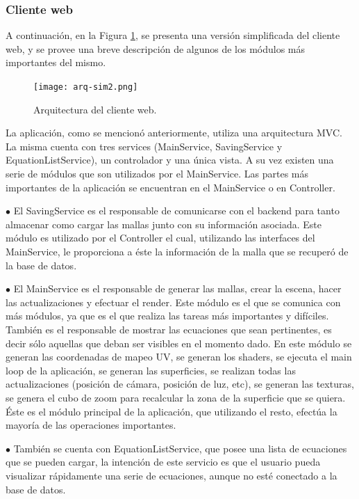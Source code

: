 \documentclass[12pt]{article}
\begin{document}
\subsubsection{Cliente web}
\noindent A continuación, en la Figura \ref{arq}, se presenta una versión simplificada del cliente web, y se provee una breve descripción de algunos de los módulos más importantes del mismo.\\
\begin{figure}[h!]
\texttt{[image: arq-sim2.png]}
\caption{Arquitectura del cliente web.}
\label{arq}
\end{figure}
La aplicación, como se mencionó anteriormente, utiliza una arquitectura MVC. La misma  cuenta con tres services (MainService, SavingService y EquationListService), un controlador y una única vista. A su vez existen una serie de módulos que son utilizados por el MainService. Las partes más importantes de la aplicación se encuentran en el MainService o en Controller.

$\bullet$ El SavingService es el responsable de comunicarse con el backend para tanto almacenar como cargar las mallas junto con su información asociada. Este módulo es utilizado por el Controller el cual, utilizando las interfaces del MainService, le proporciona a éste la información de la malla que se recuperó de la base de datos.

$\bullet$ El MainService es el responsable de generar las mallas, crear la escena, hacer las actualizaciones y efectuar el render. Este módulo es el que se comunica con más módulos, ya que es el que realiza las tareas más importantes y difíciles. También es el responsable de mostrar las ecuaciones que sean pertinentes, es decir sólo aquellas que deban ser visibles en el momento dado. En este módulo se generan las coordenadas de mapeo UV, se generan los shaders, se ejecuta el main loop de la aplicación, se generan las superficies, se realizan todas las actualizaciones (posición de cámara, posición de luz, etc), se generan las texturas, se genera el cubo de zoom para recalcular la zona de la superficie que se quiera. Éste es el módulo principal de la aplicación, que utilizando el resto, efectúa la mayoría de las operaciones importantes.

$\bullet$ También se cuenta con EquationListService, que posee una lista de ecuaciones que se pueden cargar, la intención de este servicio es que el usuario pueda visualizar rápidamente una serie de ecuaciones, aunque no esté conectado a la base de datos.
\end{document}
